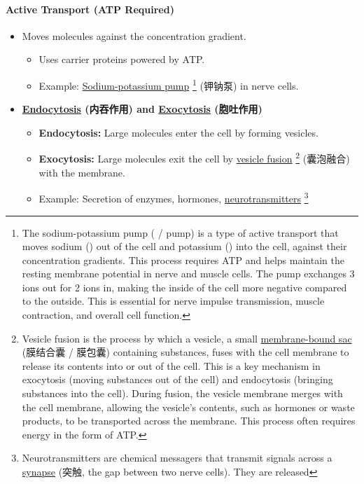 \paragraph{Active Transport (ATP Required)}
\begin{itemize}
    \item Moves molecules against the concentration gradient.
    \begin{itemize}
        \item Uses carrier proteins powered by ATP.
        \item Example: \underline{Sodium-potassium pump} \footnote{The sodium-potassium pump ( /  pump) is a
        type of active transport that moves sodium () out of the cell and potassium () into the cell, against
        their concentration gradients. This process requires ATP and helps maintain the resting membrane potential in nerve and
        muscle cells. The pump exchanges 3 ions out for 2 ions in, making the inside of the cell more negative
        compared to the outside. This is essential for nerve impulse transmission, muscle contraction, and overall cell function.}
        (钾钠泵) in nerve cells.
    \end{itemize}
    \item \textbf{\underline{Endocytosis} (内吞作用) and \underline{Exocytosis} (胞吐作用)}
    \begin{itemize}
        \item \textbf{Endocytosis:} Large molecules enter the cell by forming vesicles.
        \item \textbf{Exocytosis:} Large molecules exit the cell by \underline{vesicle fusion} \footnote{Vesicle fusion is the
        process by which a vesicle, a small \underline{membrane-bound sac} (膜结合囊 / 膜包囊) containing substances, fuses with
        the cell membrane to release its contents into or out of the cell. This is a key mechanism in exocytosis (moving
        substances out of the cell) and endocytosis (bringing substances into the cell). During fusion, the vesicle membrane
        merges with the cell membrane, allowing the vesicle's contents, such as hormones or waste products, to be transported
        across the membrane. This process often requires energy in the form of ATP.} (囊泡融合) with the membrane.
        \item Example: Secretion of enzymes, hormones, \underline{neurotransmitters} \footnote{Neurotransmitters are chemical
        messagers that transmit signals across a \underline{synapse} (突触, the gap between two nerve cells). They are released
}
\end{itemize}
\end{itemize}
